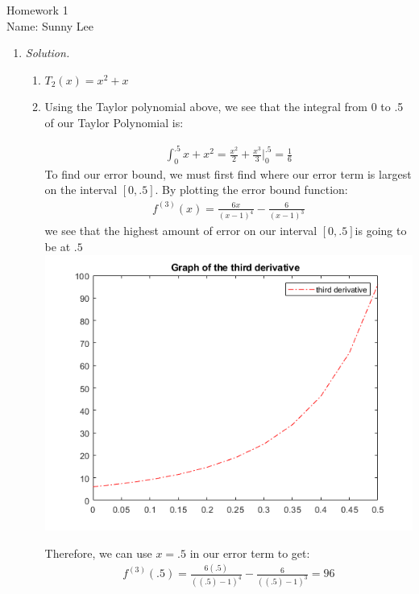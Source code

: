 \documentclass[12pt,letterpaper]{article}
\begin{document}
    Homework 1\\
    Name: Sunny Lee

    \begin{enumerate}
        \item \emph{Solution.}
            \begin{enumerate}
                \item $T_{2}(x) = x^2 + x$
                \item Using the Taylor polynomial above, we see that the integral from 0 to .5
                of our Taylor Polynomial is: 

                \begin{eqnarray*}
                    \int_{0}^{.5} x + x^2 = \frac{x^2}{2} + \frac{x^3}{3} \Big|_0^{.5} = \frac{1}{6}
                \end{eqnarray*}
                To find our error bound, we must first find where our error term is largest on the interval $[0, .5]$.
                By plotting the error bound function: 
                \begin{eqnarray}
                    f^{(3)}(x) = \frac{6x}{(x-1)^4} - \frac{6}{(x-1)^3}
                \end{eqnarray}
                we see that the highest amount of error on our interval $[0, .5]$is going to be at $.5$
                \includegraphics{third derivative.png}

                Therefore, we can use $x = .5$ in our error term to get: 
                \begin{eqnarray*}
                    f^{(3)}(.5) = \frac{6(.5)}{((.5)-1)^4} - \frac{6}{((.5)-1)^3} = 96
                \end{eqnarray*}
                

\end{enumerate}
\end{enumerate}
\end{document}
